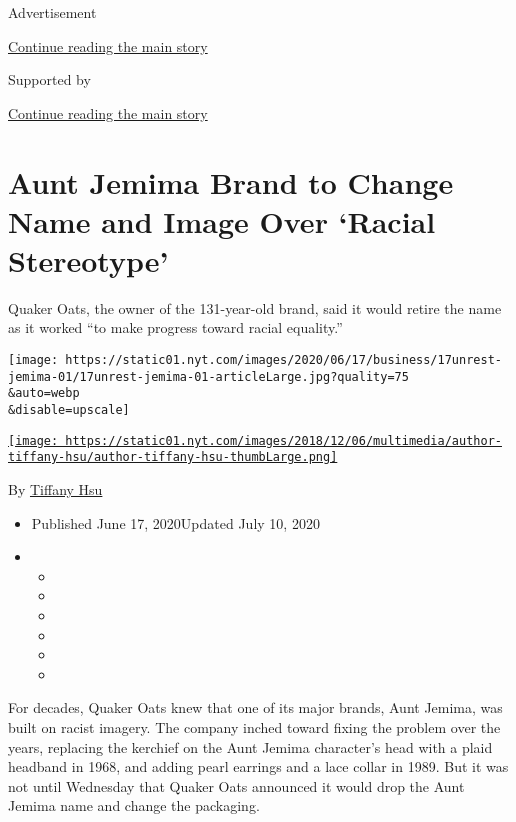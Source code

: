 Advertisement

\protect\hyperlink{after-top}{Continue reading the main story}

Supported by

\protect\hyperlink{after-sponsor}{Continue reading the main story}

\hypertarget{aunt-jemima-brand-to-change-name-and-image-over-racial-stereotype}{%
\section{Aunt Jemima Brand to Change Name and Image Over `Racial
Stereotype'}\label{aunt-jemima-brand-to-change-name-and-image-over-racial-stereotype}}

Quaker Oats, the owner of the 131-year-old brand, said it would retire
the name as it worked ``to make progress toward racial equality.''

\texttt{[image: https://static01.nyt.com/images/2020/06/17/business/17unrest-jemima-01/17unrest-jemima-01-articleLarge.jpg?quality=75\\\&auto=webp\\\&disable=upscale]}

\href{https://www.nytimes.com/by/tiffany-hsu}{\texttt{[image: https://static01.nyt.com/images/2018/12/06/multimedia/author-tiffany-hsu/author-tiffany-hsu-thumbLarge.png]}}

By \href{https://www.nytimes.com/by/tiffany-hsu}{Tiffany Hsu}

\begin{itemize}
\item
  Published June 17, 2020Updated July 10, 2020
\item
  \begin{itemize}
  \item
  \item
  \item
  \item
  \item
  \item
  \end{itemize}
\end{itemize}

For decades, Quaker Oats knew that one of its major brands, Aunt Jemima,
was built on racist imagery. The company inched toward fixing the
problem over the years, replacing the kerchief on the Aunt Jemima
character's head with a plaid headband in 1968, and adding pearl
earrings and a lace collar in 1989. But it was not until Wednesday that
Quaker Oats announced it would drop the Aunt Jemima name and change the
packaging.

